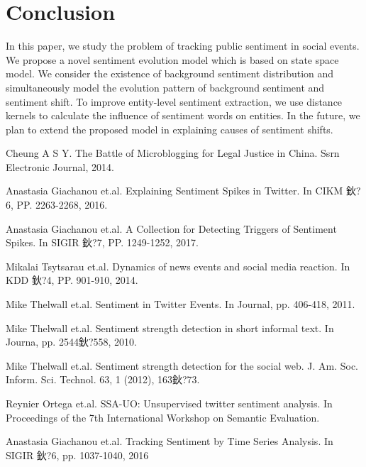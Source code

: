 \documentclass[runningheads]{llncs}
\begin{document}
\section{Conclusion}\label{sec:conclusion}
In this paper, we study the problem of tracking public sentiment in social events. We propose a novel sentiment evolution model which is based on state space model. We consider the existence of background sentiment distribution and simultaneously model the evolution pattern of background sentiment and sentiment shift. To improve entity-level sentiment extraction, we use distance kernels to calculate the influence of sentiment words on entities. In the future, we plan to extend the proposed model in explaining causes of sentiment shifts.

\begin{thebibliography}{8}

Cheung A S Y. 
\newblock The Battle of Microblogging for Legal Justice in China. 
\newblock Ssrn Electronic Journal, 2014.

Anastasia Giachanou et.al.
\newblock  Explaining Sentiment Spikes in Twitter.
\newblock In CIKM 鈥?6, PP. 2263-2268, 2016.

Anastasia Giachanou et.al.
\newblock  A Collection for Detecting Triggers of Sentiment Spikes.
\newblock In SIGIR 鈥?7, PP. 1249-1252, 2017.

Mikalai Tsytsarau et.al.
\newblock  Dynamics of news events and social media reaction.
\newblock In KDD 鈥?4, PP. 901-910, 2014.

Mike Thelwall et.al.
\newblock Sentiment in Twitter Events.
\newblock In Journal, pp. 406-418, 2011.

Mike Thelwall et.al.
\newblock Sentiment strength detection in short informal text.
\newblock In Journa, pp. 2544鈥?558, 2010.

Mike Thelwall et.al.
\newblock Sentiment strength detection for the social web.
\newblock J. Am. Soc. Inform. Sci. Technol. 63, 1 (2012), 163鈥?73.

Reynier Ortega et.al.
\newblock SSA-UO: Unsupervised twitter sentiment analysis.
\newblock In Proceedings of the 7th International Workshop on Semantic Evaluation.

Anastasia Giachanou et.al.
\newblock Tracking Sentiment by Time Series Analysis.
\newblock In SIGIR 鈥?6, pp. 1037-1040, 2016


\end{thebibliography}
\end{document}
